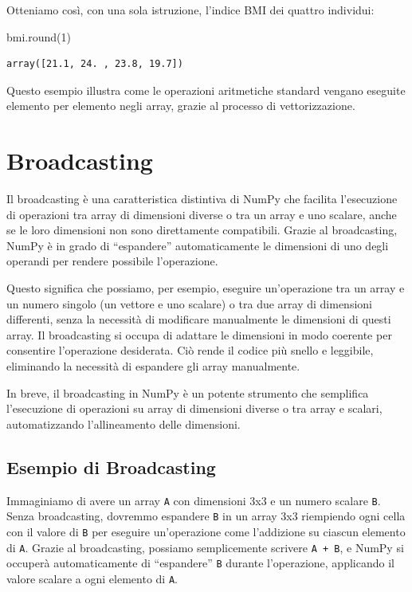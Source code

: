 \documentclass[
  letterpaper,
  krantz2]{{[}./krantz{]}}
\newenvironment{Shaded}{\begin{snugshade}}{\end{snugshade}}
\newcommand{\BuiltInTok}[1]{\textcolor[rgb]{0.00,0.23,0.31}{#1}}
\newcommand{\DecValTok}[1]{\textcolor[rgb]{0.68,0.00,0.00}{#1}}
\newcommand{\NormalTok}[1]{\textcolor[rgb]{0.00,0.23,0.31}{#1}}
\begin{document}
Otteniamo così, con una sola istruzione, l'indice BMI dei quattro
individui:

\begin{Shaded}
\begin{Highlighting}[]
\NormalTok{bmi.}\BuiltInTok{round}\NormalTok{(}\DecValTok{1}\NormalTok{)}
\end{Highlighting}
\end{Shaded}

\begin{verbatim}
array([21.1, 24. , 23.8, 19.7])
\end{verbatim}

Questo esempio illustra come le operazioni aritmetiche standard vengano
eseguite elemento per elemento negli array, grazie al processo di
vettorizzazione.

\section{Broadcasting}\label{broadcasting}

Il broadcasting è una caratteristica distintiva di NumPy che facilita
l'esecuzione di operazioni tra array di dimensioni diverse o tra un
array e uno scalare, anche se le loro dimensioni non sono direttamente
compatibili. Grazie al broadcasting, NumPy è in grado di ``espandere''
automaticamente le dimensioni di uno degli operandi per rendere
possibile l'operazione.

Questo significa che possiamo, per esempio, eseguire un'operazione tra
un array e un numero singolo (un vettore e uno scalare) o tra due array
di dimensioni differenti, senza la necessità di modificare manualmente
le dimensioni di questi array. Il broadcasting si occupa di adattare le
dimensioni in modo coerente per consentire l'operazione desiderata. Ciò
rende il codice più snello e leggibile, eliminando la necessità di
espandere gli array manualmente.

In breve, il broadcasting in NumPy è un potente strumento che semplifica
l'esecuzione di operazioni su array di dimensioni diverse o tra array e
scalari, automatizzando l'allineamento delle dimensioni.

\subsection{Esempio di Broadcasting}\label{esempio-di-broadcasting}

Immaginiamo di avere un array \texttt{A} con dimensioni 3x3 e un numero
scalare \texttt{B}. Senza broadcasting, dovremmo espandere \texttt{B} in
un array 3x3 riempiendo ogni cella con il valore di \texttt{B} per
eseguire un'operazione come l'addizione su ciascun elemento di
\texttt{A}. Grazie al broadcasting, possiamo semplicemente scrivere
\texttt{A\ +\ B}, e NumPy si occuperà automaticamente di ``espandere''
\texttt{B} durante l'operazione, applicando il valore scalare a ogni
elemento di \texttt{A}.
\end{document}

